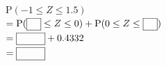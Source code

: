 \noindent\begin{minipage}[t]{0.58\linewidth}\vspace{0pt}\raggedright $\mathrm{P}(-1\le Z\le 1.5)$\\ $=\mathrm{P}(\blank\le Z\le 0)+\mathrm{P}(0\le Z\le\blank)$\\ $=\blank[3em]+0.4332$\\ $=\blank[3em]$\end{minipage}\hfill\begin{minipage}[t]{0.4\linewidth}\vspace{0pt}\centering \resizebox{\ifdim\width>\linewidth\linewidth\else\width\fi}{!}{}\end{minipage}\par
